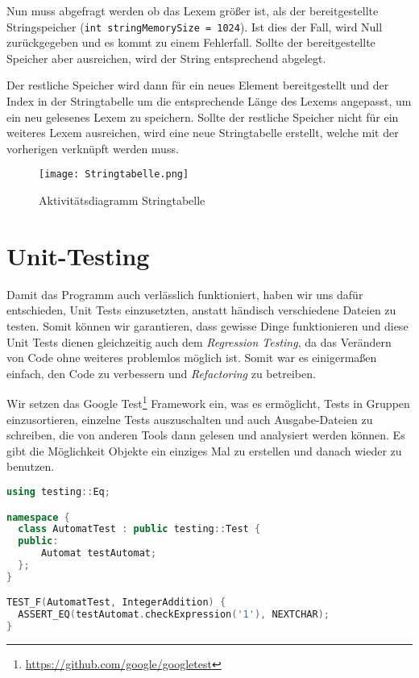Nun muss abgefragt werden ob das Lexem größer ist, als der bereitgestellte Stringspeicher (\texttt{int stringMemorySize = 1024}). Ist dies der Fall, wird Null zurückgegeben und es kommt zu einem Fehlerfall. Sollte der bereitgestellte Speicher aber ausreichen, wird der String entsprechend abgelegt.

Der restliche Speicher wird dann für ein neues Element bereitgestellt und der Index in der Stringtabelle um die entsprechende Länge des Lexems angepasst, um ein neu gelesenes Lexem zu speichern. Sollte der restliche Speicher nicht für ein weiteres Lexem ausreichen, wird eine neue Stringtabelle erstellt, welche mit der vorherigen verknüpft werden muss.

\begin{figure}[!htb]
    \centering
      \texttt{[image: Stringtabelle.png]}
    \caption{Aktivitätsdiagramm Stringtabelle}\label{fig:stringtabelle}
\end{figure}

\section{Unit-Testing}\label{sec:UnitTests}
Damit das Programm auch verlässlich funktioniert, haben wir uns dafür entschieden, Unit Tests einzusetzten, anstatt händisch verschiedene Dateien zu testen. Somit können wir garantieren, dass gewisse Dinge funktionieren und diese Unit Tests dienen gleichzeitig auch dem \textit{Regression Testing}, da das Verändern von Code ohne weiteres problemlos möglich ist. Somit war es einigermaßen einfach, den Code zu verbessern und \textit{Refactoring} zu betreiben.

Wir setzen das Google Test\footnote{\url{https://github.com/google/googletest}} Framework ein, was es ermöglicht, Tests in Gruppen einzusortieren, einzelne Tests auszuschalten und auch Ausgabe-Dateien zu schreiben, die von anderen Tools dann gelesen und analysiert werden können. Es gibt die Möglichkeit Objekte ein einziges Mal zu erstellen und danach wieder zu benutzen.

\begin{lstlisting}[language=C++, caption=Unit Test mit wiederverwendbarem Objekt]
using testing::Eq;

namespace {
  class AutomatTest : public testing::Test {
  public:
      Automat testAutomat;
  };
}

TEST_F(AutomatTest, IntegerAddition) {
  ASSERT_EQ(testAutomat.checkExpression('1'), NEXTCHAR);
}
\end{lstlisting}

